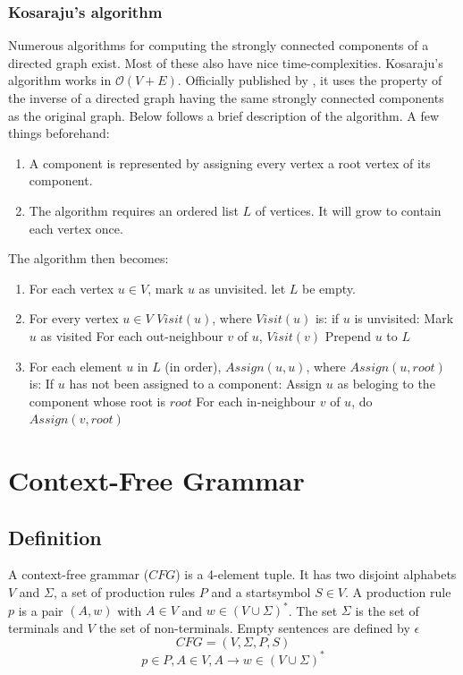 		\subsubsection{Kosaraju's algorithm}
		\label{sec:Kosaraju}
		Numerous algorithms for computing the strongly connected components of a directed graph exist. Most of these also have nice time-complexities. Kosaraju's algorithm works in $\mathcal{O}(V+E)$. Officially published by \parencite{Kosaraju}, it uses the property of the inverse of a directed graph having the same strongly connected components as the original graph. Below follows a brief description of the algorithm. A few things beforehand:
		
		\begin{enumerate}
			\item A component is represented by assigning every vertex a root vertex of its component.
			\item The algorithm requires an ordered list $L$ of vertices. It will grow to contain each vertex once.
		\end{enumerate}
		The algorithm then becomes:
		\begin{enumerate}
			\item For each vertex $u \in V$, mark $u$ as unvisited. let $L$ be empty.
			\item For every vertex $u \in V$ $Visit(u)$, where $Visit(u)$ is:
				\subitem if $u$ is unvisited:
					\subsubitem Mark $u$ as visited
					\subsubitem For each out-neighbour $v$ of $u$, $Visit(v)$
					\subsubitem Prepend $u$ to $L$
			\item For each element $u$ in $L$ (in order), $Assign(u,u)$, where $Assign(u,root)$ is:
				\subitem If $u$ has not been assigned to a component:
					\subsubitem Assign $u$ as beloging to the component whose root is $root$
					\subsubitem For each in-neighbour $v$ of $u$, do $Assign(v, root)$
		\end{enumerate}
		
		
		
	\pagebreak
	
\section{Context-Free Grammar}
	\subsection{Definition}	\label{sec:CFG_def}
	A context-free grammar ($CFG$) is a 4-element tuple. It has two disjoint alphabets $V$ and $\Sigma$, a set of production rules $P$ and a startsymbol $S \in V$. A production rule $p$ is a pair $(A, w)$ with $A \in V$ and $w \in (V \cup \Sigma)^*$. The set $\Sigma$ is the set of terminals and $V$ the set of non-terminals. Empty sentences are defined by $\epsilon$\\
	\begin{equation} CFG = (V, \Sigma, P, S) \end{equation}	
	\begin{equation} p \in P, A \in V, A \rightarrow w \in (V \cup \Sigma)^*\end{equation}	
			
